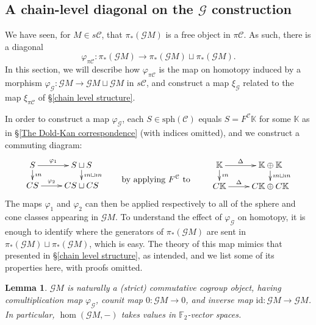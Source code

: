 \documentclass[11pt]{amsart} \renewcommand{\baselinestretch}{1.2}
\theoremstyle{plain}
\newtheorem{lem}[thm]{Lemma}
\numberwithin{equation}{section} %
\theoremstyle{plain}
\newtheorem{lem}[thm]{Lemma}
\numberwithin{equation}{chapter} %
\newcommand{\DASH}{\mathrm{-}}
\let\phi\varphi
\renewcommand{\to}{\longrightarrow}
\newcommand{\scrG}{\mathscr{G}}
\newcommand{\calV}{\mathcal{V}}
\newcommand{\calc}{\mathcal{C}}
\newcommand{\spheres}[1]{\mathrm{sph}(#1)}
\newcommand{\vect}[2]{\calV^{#1}_{#2}}
\newcommand{\BSW}{{\scrG}}
\newcommand{\PA}[1]{\pi#1}
\newcommand{\F}{\mathbb{F}}
\newcommand{\Id}{\mathrm{id}}
\newcommand{\Ftwo}{\F_2}
\newcommand{\bdyinc}{\imath n}
\newcommand{\SubsectionOrSection}[1]{\subsection{#1}}
\begin{document}
\begin{Comp funct sseqs}
\SubsectionOrSection{A chain-level diagonal on the $\BSW $ construction}
\label{Subsection: Chain level diagonal}
We have seen, for $M\in s\calc$, that $\pi_*(\BSW M)$ is a free object in $\PA{\calc}$. As such, there is a diagonal
\[\phi_{\PA{\calc}}:\pi_*(\BSW M)\to \pi_*(\BSW M)\sqcup \pi_*(\BSW M).\]
In this section, we will describe how $\phi_{\PA{\calc}}$ is the map on homotopy induced by a morphism $\phi_\BSW :\BSW M\to \BSW M\sqcup \BSW M$ in $s\calc$, and construct a map $\xi_{\BSW}$ related to the map $\xi_{\PA{\calc}}$ of \S\ref{chain level structure}. %

In order to construct a map $\phi_\BSW $, each $S\in\spheres{\calc}$ equals $S=F^\calc\mathbb{K}$ for some $\mathbb{K}$ as in \S\ref{The Dold-Kan correspondence} (with indices omitted), and we construct a commuting diagram:
\[\xymatrix@R=4mm{
S\ar[r]^-{\phi_1}
\ar[d]^-{\bdyinc}
&%
S\sqcup S\ar[d]^-{\bdyinc\sqcup\bdyinc}
\\%
CS\ar[r]^-{\phi_2}
&%
CS\sqcup CS%
}\qquad \textup{\raisebox{-6mm}{by applying $F^\calc$ to }}\qquad \xymatrix@R=4mm{
\mathbb{K}\ar[r]^-{\Delta}
\ar[d]^-{\bdyinc}
&%
\mathbb{K}\oplus \mathbb{K}\ar[d]^-{\bdyinc\sqcup\bdyinc}
\\%
C\mathbb{K}\ar[r]^-{\Delta}
&%
C\mathbb{K}\oplus C\mathbb{K}%
}\]
The maps $\phi_1$ and $\phi_2$ can then be applied respectively to all of the sphere and cone classes appearing in $\BSW M$.
To understand the effect of $\phi_{\BSW }$ on homotopy, it is enough to identify where the generators of $\pi_*(\BSW M)$ are sent in $\pi_*(\BSW M)\sqcup\pi_*(\BSW M)$, which is easy. The theory of this map mimics that presented in \S\ref{chain level structure}, as intended, and we list some of its properties here, with proofs omitted.
\begin{lem}
$\BSW M$ is naturally a (strict) commutative cogroup object, having comultiplication map $\phi_{\BSW }$, counit map $0:\BSW M\to 0$, and inverse map $\Id:\BSW M\to \BSW M$. In particular, $\hom(\BSW M,\DASH)$ takes values in $\ensuremath{\Ftwo }$-vector spaces.
\end{lem}

\end{Comp funct sseqs}
\end{document}
